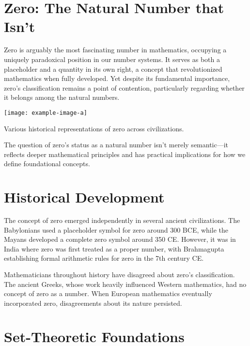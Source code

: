 \documentclass[../../../OAE-SPEC-MAIN.tex]{subfiles}
\begin{document}
\section{Zero: The Natural Number that Isn't}

Zero is arguably the most fascinating number in mathematics, occupying a uniquely paradoxical position in our number systems. It serves as both a placeholder and a quantity in its own right, a concept that revolutionized mathematics when fully developed. Yet despite its fundamental importance, zero's classification remains a point of contention, particularly regarding whether it belongs among the natural numbers.

\begin{marginfigure}
\texttt{[image: example-image-a]}
\caption{Various historical representations of zero across civilizations.}
\end{marginfigure}

The question of zero's status as a natural number isn't merely semantic---it reflects deeper mathematical principles and has practical implications for how we define foundational concepts.

\section{Historical Development}

The concept of zero emerged independently in several ancient civilizations. The Babylonians used a placeholder symbol for zero around 300 BCE, while the Mayans developed a complete zero symbol around 350 CE. However, it was in India where zero was first treated as a proper number, with Brahmagupta establishing formal arithmetic rules for zero in the 7th century CE.


Mathematicians throughout history have disagreed about zero's classification. The ancient Greeks, whose work heavily influenced Western mathematics, had no concept of zero as a number. When European mathematics eventually incorporated zero, disagreements about its nature persisted.

\section{Set-Theoretic Foundations}
\end{document}
